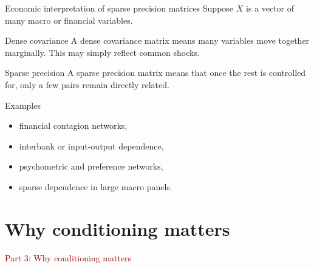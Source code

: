 \documentclass[dvipsnames,aspectratio=169,handout]{beamer}
\begin{document}
\begin{frame}{Economic interpretation of sparse precision matrices}
Suppose $X$ is a vector of many macro or financial variables.

\begin{block}{Dense covariance}
A dense covariance matrix means many variables move together marginally.
This may simply reflect common shocks.
\end{block}

\begin{block}{Sparse precision}
A sparse precision matrix means that once the rest is controlled for,
only a few pairs remain directly related.
\end{block}

\begin{alertblock}{Examples}
\begin{itemize}
    \item financial contagion networks,
    \item interbank or input-output dependence,
    \item psychometric and preference networks,
    \item sparse dependence in large macro panels.
\end{itemize}
\end{alertblock}
\end{frame}


\section{Why conditioning matters}

\begin{frame}{}
\begin{center}
{\Huge \textcolor{DarkRed}{Part 3: Why conditioning matters}}
\end{center}
\end{frame}
\end{document}
